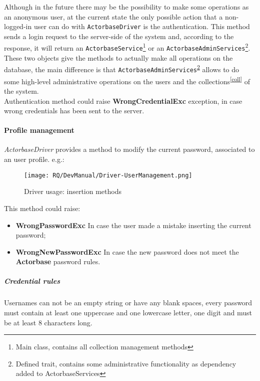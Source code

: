 \documentclass{scalatekids-article}
\begin{document}
Although in the future there may be the possibility to make some
operations as an anonymous user, at the current state the only possible action
that a non-logged-in user can do with \verb=ActorbaseDriver= is the authentication.
This method sends a login request to the server-side of the system and, according
to the response, it will return an \verb=ActorbaseService=\footnote{Main class,
  contains all collection management methods\label{ActorbaseServices}} or an
\verb=ActorbaseAdminServices=\footnote{Defined trait, contains some
  administrative functionality as dependency added to
  ActorbaseServices\label{AdminServices}}. These two objects give the methods to
actually make all operations on the database, the main difference is that
\verb=ActorbaseAdminServices=\textsuperscript{\ref{AdminServices}} allows to do
some high-level administrative operations on the users and the
collections\textsuperscript{\ref{coll}} of the system.\\
Authentication method could raise \textbf{WrongCredentialExc} exception, in case
wrong credentials has been sent to the server.

\paragraph{Profile management}

\textit{ActorbaseDriver} provides a method to modify the current password,
associated to an user profile.
e.g.:
\begin{figure}[H]
  \begin{center}
    \texttt{[image: RQ/DevManual/Driver-UserManagement.png]}
    \caption{Driver usage: insertion methods}
  \end{center}
\end{figure}
This method could raise:
\begin{itemize}
\item \textbf{WrongPasswordExc} In case the user made a mistake inserting the current password;
\item \textbf{WrongNewPasswordExc} In case the new password does not meet the \textbf{Actorbase} password rules.
\end{itemize}

\subparagraph{Credential rules}
Usernames can not be an empty string or have any blank spaces, every password must
contain at least one uppercase and one lowercase letter, one digit and must be at
least 8 characters long.
\end{document}
